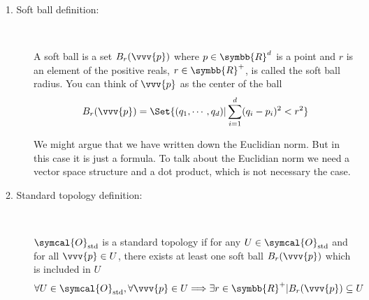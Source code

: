 \begin{description}
\item[1. Soft ball definition:]\ 

  A soft ball is a set $B_r(\vvv{p})$ where $p\in\symbb{R}^d$ is a point and $r$ is an element of the
  positive reals, $r\in\symbb{R}^+$, is called the soft ball radius. You can think of $\vvv{p}$ as the
  center of the ball
  \begin{equation}\label{eq:tplg-softball}
    B_r(\vvv{p})
    = \Set{(q_1, \cdots, q_d) | \sum_{i=1}^d (q_i - p_i)^2 < r^2}
  \end{equation}
  
  We might argue that we have written down the Euclidian norm. But in this case it is just a formula.
  To talk about the Euclidian norm we need a vector space structure and a dot product, which is not
  necessary the case.

\item[2. Standard topology definition:]\ 

  $\symcal{O}_{\text{std}}$ is a standard topology if for any $U\in\symcal{O}_{\text{std}}$ and
  for all $\vvv{p}\in U$, there exists at least one soft ball $B_r(\vvv{p})$ which is included in $U$
  \begin{equation}
    \forall U\in\symcal{O}_{\text{std}}, \forall \vvv{p}\in U
    \Longrightarrow \exists r\in\symbb{R}^+ | B_r(\vvv{p})\subseteq U
  \end{equation}
\end{description}


